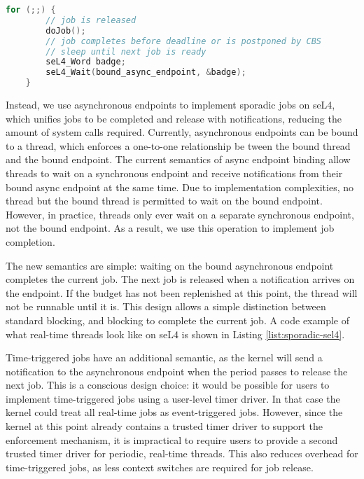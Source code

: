 \begin{lstlisting}[frame=single,language=c,caption=Example of a basic sporadic real-time task on sel4.,    label=list:sporadic-sel4]
    for (;;) {
        // job is released
        doJob();
        // job completes before deadline or is postponed by CBS
        // sleep until next job is ready
        seL4_Word badge;
        seL4_Wait(bound_async_endpoint, &badge);
    }
\end{lstlisting}

Instead, we use asynchronous endpoints to implement sporadic jobs on seL4, which unifies jobs to be completed and release with notifications, reducing the amount of system calls required.
Currently, asynchronous endpoints can be bound to a thread, which enforces a one-to-one relationship be  tween the bound thread and the bound endpoint.
The current semantics of async endpoint binding allow threads to wait on a synchronous endpoint and receive notifications from their bound async endpoint at the same time.
Due to implementation complexities, no thread but the bound thread is permitted to wait on the bound endpoint.
However, in practice, threads only ever wait on a separate synchronous endpoint, not the bound endpoint.
As a result, we use this operation to implement job completion.

The new semantics are simple: waiting on the bound asynchronous endpoint completes the current job.
The next job is released when a notification arrives on the endpoint.
If the budget has not been replenished at this point, the thread will not be runnable until it is.
This design allows a simple distinction between standard blocking, and blocking to complete the current job.
A code example of what real-time threads look like on seL4 is shown in Listing \ref{list:sporadic-sel4}.

Time-triggered jobs have an additional semantic, as the kernel will send a notification to the asynchronous endpoint when the period passes to release the next job.
This is a conscious design choice: it would be possible for users to implement time-triggered jobs using a user-level timer driver.
In that case the kernel could treat all real-time jobs as event-triggered jobs.
However, since the kernel at this point already contains a trusted timer driver to support the enforcement mechanism, it is impractical to require users to provide a second trusted timer driver for periodic, real-time threads.
This also reduces overhead for time-triggered jobs, as less context switches are required for job release.

